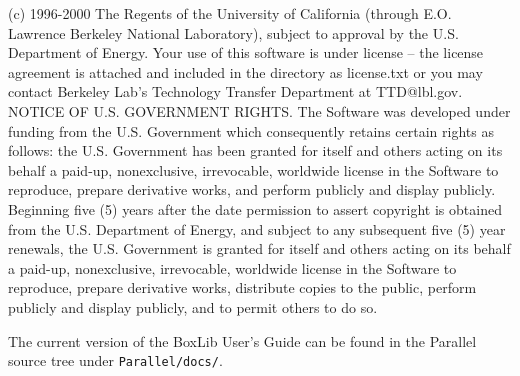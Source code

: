 \noindent (c) 1996-2000 The Regents of the University of California (through
E.O. Lawrence Berkeley National Laboratory), subject to approval by
the U.S. Department of Energy.  Your use of this software is under
license -- the license agreement is attached and included in the
directory as license.txt or you may contact Berkeley Lab's Technology
Transfer Department at TTD@lbl.gov.  NOTICE OF U.S. GOVERNMENT RIGHTS.
The Software was developed under funding from the U.S. Government
which consequently retains certain rights as follows: the
U.S. Government has been granted for itself and others acting on its
behalf a paid-up, nonexclusive, irrevocable, worldwide license in the
Software to reproduce, prepare derivative works, and perform publicly
and display publicly.  Beginning five (5) years after the date
permission to assert copyright is obtained from the U.S. Department of
Energy, and subject to any subsequent five (5) year renewals, the
U.S. Government is granted for itself and others acting on its behalf
a paid-up, nonexclusive, irrevocable, worldwide license in the
Software to reproduce, prepare derivative works, distribute copies to
the public, perform publicly and display publicly, and to permit
others to do so.

\noindent The current version of the BoxLib User's Guide can be found in 
the Parallel source tree under {\tt Parallel/docs/}.
